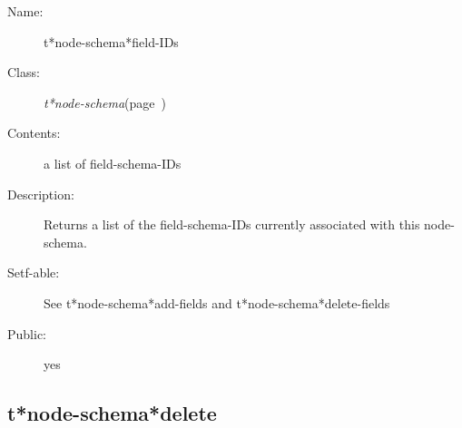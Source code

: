 \begin{description}
\item [Name:]  t*node-schema*field-IDs

\item [Class:] {\sl t*node-schema}\hfill(page~\pageref{t*node-schema})

\item [Contents:] a list of field-schema-IDs

\item [Description:]

Returns a list of the field-schema-IDs currently 
associated with this node-schema.

\item [Setf-able:] See t*node-schema*add-fields and 
t*node-schema*delete-fields
 
\item [Public:] yes



\end{description}
\horizontalline

\subsection{t*node-schema*delete}
\label{t*node-schema*delete}

